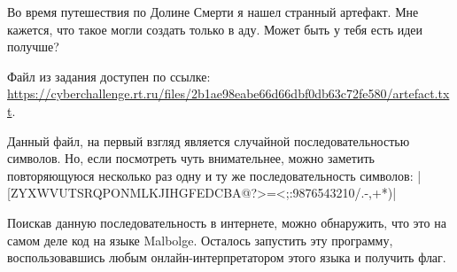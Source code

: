 
Во время путешествия по Долине Смерти я нашел странный артефакт. Мне кажется, что такое могли создать только в аду. Может быть у тебя есть идеи получше?

Файл из задания доступен по ссылке: \url{https://cyberchallenge.rt.ru/files/2b1ae98eabe66d66dbf0db63c72fe580/artefact.txt}.

\solutionSection

Данный файл, на первый взгляд является случайной последовательностью символов. Но, если посмотреть чуть внимательнее, можно заметить повторяющуюся несколько раз одну и ту же последовательность символов:
|[ZYXWVUTSRQPONMLKJIHGFEDCBA@?>=<;:9876543210/.-,+*)|

Поискав данную последовательность в интернете, можно обнаружить, что это на самом деле код на языке Malbolge. Осталось запустить эту программу, воспользовавшись любым онлайн-интерпретатором этого языка и получить флаг.

